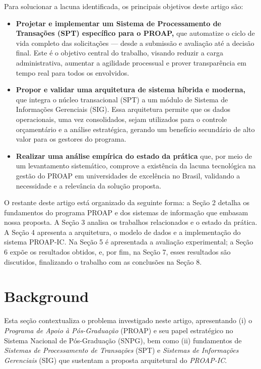 \documentclass[portuguese]{sbc2025}%
\begin{document}
Para solucionar a lacuna identificada, os principais objetivos deste artigo são:
\begin{itemize}
    \item \textbf{Projetar e implementar um Sistema de Processamento de Transações (SPT) específico para o PROAP,} que automatize o ciclo de vida completo das solicitações — desde a submissão e avaliação até a decisão final. Este é o objetivo central do trabalho, visando reduzir a carga administrativa, aumentar a agilidade processual e prover transparência em tempo real para todos os envolvidos.
    \item \textbf{Propor e validar uma arquitetura de sistema híbrida e moderna,} que integra o núcleo transacional (SPT) a um módulo de Sistema de Informações Gerenciais (SIG). Essa arquitetura permite que os dados operacionais, uma vez consolidados, sejam utilizados para o controle orçamentário e a análise estratégica, gerando um benefício secundário de alto valor para os gestores do programa.
    \item \textbf{Realizar uma análise empírica do estado da prática} que, por meio de um levantamento sistemático, comprove a existência da lacuna tecnológica na gestão do PROAP em universidades de excelência no Brasil, validando a necessidade e a relevância da solução proposta.
\end{itemize}

O restante deste artigo está organizado da seguinte forma: a Seção 2 detalha os fundamentos do programa PROAP e dos sistemas de informação que embasam nossa proposta. A Seção 3 analisa os trabalhos relacionados e o estado da prática. A Seção 4 apresenta a arquitetura, o modelo de dados e a implementação do sistema PROAP-IC. Na Seção 5 é apresentada a avaliação experimental; a Seção 6 expõe os resultados obtidos, e, por fim, na Seção 7, esses resultados são discutidos, finalizando o trabalho com as conclusões na Seção 8.

\section{Background}

Esta seção contextualiza o problema investigado neste artigo, apresentando (i) o \textit{Programa de Apoio à Pós-Graduação} (PROAP) e seu papel estratégico no Sistema Nacional de Pós-Graduação (SNPG), bem como (ii) fundamentos de \textit{Sistemas de Processamento de Transações} (SPT) e \textit{Sistemas de Informações Gerenciais} (SIG) que sustentam a proposta arquitetural do \textit{PROAP-IC}.
\end{document}
